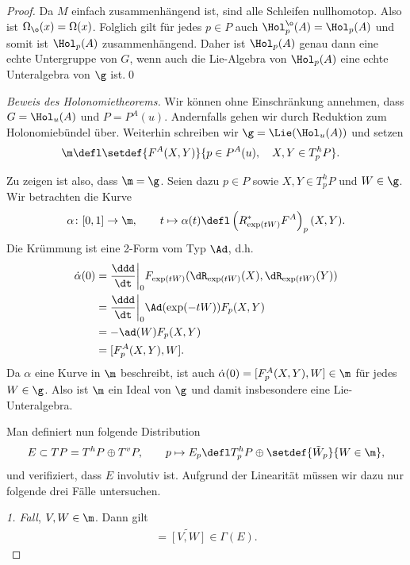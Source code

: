 \documentclass[%
	paper=a5,%
	fleqn,%
	DIV=18,%
	BCOR=0mm,
	fontsize=11pt,
	titlepage=false,%
	bibliography=totoc,
	DIV=18,%
	twoside=true,
	pdftitle=Riemannsche Geometrie,
	pdfauthor=Uwe Semmelmann,
	numbers=noendperiod]%
	{scrbook}
\begin{document}
\begin{proof}
Da $M$ einfach zusammenhängend ist, sind alle Schleifen nullhomotop. Also ist $\Omega_{\o}(x) = \Omega(x)$. Folglich gilt für jedes $p\in P$ auch $\Hol_{p}^\o(A) = \Hol_{p}(A)$ und somit ist $\Hol_{p}(A)$ zusammenhängend. Daher ist $\Hol_{p}(A)$ genau dann eine echte Untergruppe von $G$, wenn auch die Lie-Algebra von $\Hol_{p}(A)$ eine echte Unteralgebra von $\g$ ist.\qed
\end{proof}

\begin{proof}[Beweis des Holonomietheorems]
Wir können ohne Einschränkung annehmen, dass $G=\Hol_{u}(A)$ und $P=P^A(u)$. Andernfalls gehen wir durch Reduktion zum Holonomiebündel über. Weiterhin schreiben wir $\g = \Lie(\Hol_{u}(A))$ und setzen
\begin{align*}
\m \defl \span\setdef{F^A(X,Y)}{p\in P^A(u),\quad X,Y\in T_{p}^hP}.
\end{align*}

Zu zeigen ist also, dass $\m = \g$. Seien dazu $p\in P$ sowie $X,Y\in T^h_{p}P$ und $W\in \g$. Wir betrachten die Kurve
\begin{align*}
\alpha\colon [0,1] \to \m,\qquad t\mapsto \alpha(t) \defl \left(R_{\exp(tW)}^* F^A\right)_{p}(X,Y).
\end{align*}
Die Krümmung ist eine 2-Form vom Typ $\Ad$, d.h.
\begin{align*}
\dot{\alpha}(0) &=  \frac{\ddd}{\dt}\bigg|_{0} F_{\exp(tW)}(\dR_{\exp(tW)}(X),\dR_{\exp(tW)}(Y))\\
&= \frac{\ddd}{\dt}\bigg|_{0} \Ad(\exp(-tW))F_{p}(X,Y)\\
&= -\ad(W) F_{p}(X,Y)\\
&= [F_{p}^A(X,Y),W].
\end{align*}
Da $\alpha$ eine Kurve in $\m$ beschreibt, ist auch $\dot{\alpha}(0)=[F_{p}^A(X,Y),W]\in\m$ für jedes $W\in\g$. Also ist $\m$ ein Ideal von $\g$ und damit insbesondere eine Lie-Unteralgebra.

Man definiert nun folgende Distribution
\begin{align*}
E \subset TP = T^hP\oplus T^vP,\qquad 
p\mapsto E_{p}\defl T_{p}^hP\oplus \setdef{\tilde{W}_{p}}{W\in \m},
\end{align*}
und verifiziert, dass $E$ involutiv ist. Aufgrund der Linearität müssen wir dazu nur folgende drei Fälle untersuchen.

\textit{1. Fall}, $V,W\in \m$. Dann gilt
\begin{align*}
[\tilde{V},\tilde{W}] = \widetilde{[V,W]} \in \Gamma(E).
\end{align*}


\end{proof}
\end{document}
